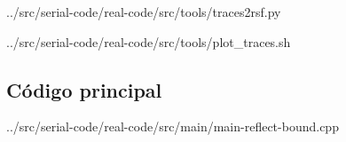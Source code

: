 \begin{appendices}
	
	{../src/serial-code/real-code/src/tools/traces2rsf.py}
	
	
	{../src/serial-code/real-code/src/tools/plot_traces.sh}
	
	\subsection{Código principal}
	
	{../src/serial-code/real-code/src/main/main-reflect-bound.cpp}
	

\end{appendices}